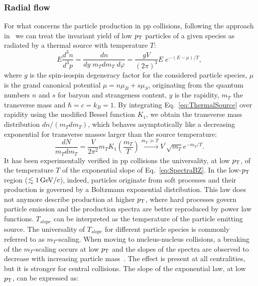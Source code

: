 \subsubsection{Radial flow}
\label{sec:RadialFlow}
For what concerns the particle production in pp collisions, 
following the approach in~\cite{Schnedermann:1993ws} we 
can treat the invariant yield of low $p_{\rm T}$ particles of a given species as radiated by a
 thermal source with temperature $T$:
\begin{equation}
\label{eq:ThermalSource}
E\frac{d^{3}n}{d^3p} = \frac{dn}{dy \; m_{T} dm_T\;d\varphi} = \frac{gV}{(2\pi)^3}E\;e^{-(E-\mu)/T},
\end{equation}
  where $g$ is the spin-isospin degeneracy factor for the considered particle 
  species, $\mu$ is the grand canonical potential $\mu = n\mu_{B}+ s\mu_S$, 
  originating from the quantum numbers $n$ and $s$ for baryon and 
  strangeness content, $y$ is the rapidity, $m_{T}$ the transverse 
  mass and $\hbar = c = k_B = 1$. By integrating Eq.~\ref{eq:ThermalSource}
   over rapidity using the modified Bessel function $K_1$, we obtain
    the transverse mass distribution $dn/(m_Tdm_T)$, which behaves 
    asymptotically like a decreasing exponential for transverse masses 
    larger than the source temperature: 
\begin{equation}
\label{eq:SpectraBZ}
\frac{dN}{m_T dm_T} = \frac{V}{2\pi^2} m_T K_1 (\frac{m_T}{T}) \xrightarrow{m_T \gg T} V^\prime \sqrt{m_T} e^{-m_T/T}.
\end{equation}
It has been experimentally verified in pp collisions the universality, at low $p_{\rm T}$,
of the temperature $T$ of the exponential slope of Eq.~\ref{eq:SpectraBZ}. 
In the low-$p_{\rm T}$ region ($\lesssim 1 \, \mathrm{GeV}/c$), indeed, particles originate from soft processes
and their production is governed by a Boltzmann exponential distribution. 
This law does not anymore describe production at higher $p_{\rm T}$, where hard processes
govern particle emission and the production spectra are better reproduced by power law functions.
 $T_{slope}$ can be interpreted as the temperature of the particle
 emitting source. The universality of $T_{slope}$ for different 
 particle species is commonly referred to as $m_{T}$-scaling. When 
 moving to nucleus-nucleus collisions, a breaking of the $m_T$-scaling 
 occurs at low $p_{\rm T}$ and the slopes of the spectra are observed to 
 decrease with increasing particle mass~\cite{Appelshauser:1998yb,Arnaldi:2007ru}.
  The effect is present at all centralities, but it is stronger for central
   collisions. The slope of the exponential law, at low $p_{\rm T}$, can be expressed as:
